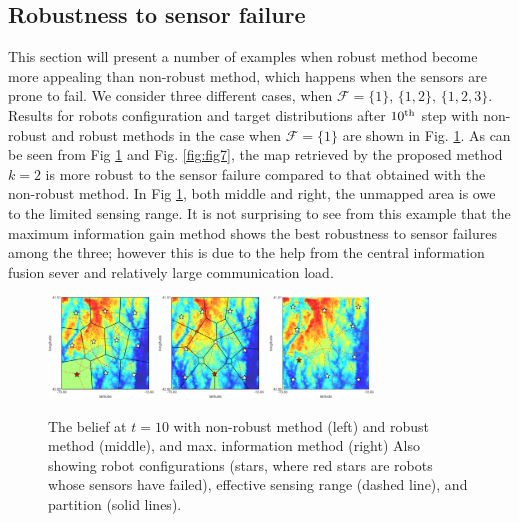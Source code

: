 \documentclass[letterpaper, 10 pt, conference]{ieeeconf}
\begin{document}
\subsection{Robustness to sensor failure}
This section will present a number of examples when robust method become more appealing than non-robust method, which happens when the sensors are prone to fail. 
We consider three different cases, when $\mathcal{F} = \lbrace 1 \rbrace,\,\lbrace 1,2\rbrace,\,\lbrace 1,2,3 \rbrace$.
Results for robots configuration and target distributions after $10^{\textup{th}}$ step with non-robust and robust methods in the case when $\mathcal{F}= \lbrace 1\rbrace$ are shown in Fig. \ref{fig:fig6}. 
As can be seen from Fig \ref{fig:fig6} and Fig. \ref{fig:fig7}, the map retrieved by the proposed method $k=2$ is more robust to the sensor failure compared to that obtained with the non-robust method. In Fig \ref{fig:fig6}, both middle and right, the unmapped area is owe to the limited sensing range.
It is not surprising to see from this example that the maximum information gain method shows the best robustness to sensor failures among the three; however this is due to the help from the central information fusion sever and relatively large communication load.
\begin{figure}
	\centering
	\includegraphics[width=1.1in]{figure/new_fault1}
	\includegraphics[width=1.1in]{figure/new_fault2}
	\includegraphics[width=1.1in]{figure/new_faultn}
	\caption{The belief at $t=10$ with non-robust method (left) and robust method (middle), and max. information method (right) Also showing robot configurations (stars, where red stars are robots whose sensors have failed), effective sensing range (dashed line), and partition (solid lines).
	}
	\label{fig:fig6}
\end{figure}
\end{document}
